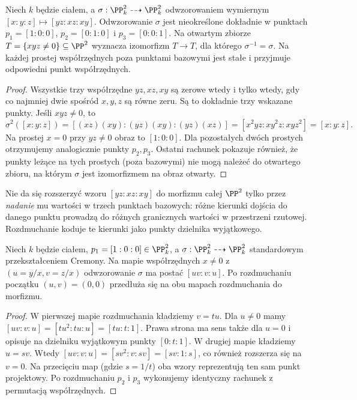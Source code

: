 \begin{stwierdzenie}
\label{st:ga8-cremona-basic}
Niech $k$ będzie ciałem, a
$\sigma:\PP^2_k\dashrightarrow\PP^2_k$ odwzorowaniem wymiernym
$[x:y:z]\mapsto[yz:xz:xy]$.
Odwzorowanie $\sigma$ jest nieokreślone dokładnie w punktach
$p_1=[1:0:0]$, $p_2=[0:1:0]$ i $p_3=[0:0:1]$.
Na otwartym zbiorze $T=\{xyz\ne0\}\subseteq\PP^2$
wyznacza izomorfizm $T\to T$, dla którego
$\sigma^{-1}=\sigma$. Na każdej prostej współrzędnych
poza punktami bazowymi jest stałe i przyjmuje
odpowiedni punkt współrzędnych.
\end{stwierdzenie}
\begin{proof}
Wszystkie trzy współrzędne $yz,xz,xy$ są zerowe
wtedy i tylko wtedy, gdy co najmniej dwie spośród
$x,y,z$ są równe zeru. Są to dokładnie trzy wskazane
punkty. Jeśli $xyz\ne0$, to
\[
\sigma^2([x:y:z])
=[(xz)(xy):(yz)(xy):(yz)(xz)]
=[x^2yz:xy^2z:xyz^2]=[x:y:z].
\]
Na prostej $x=0$ przy $yz\ne0$ obraz to $[1:0:0]$.
Dla pozostałych dwóch prostych otrzymujemy analogicznie
punkty $p_2,p_3$. Ostatni rachunek pokazuje również,
że punkty leżące na tych prostych (poza bazowymi)
nie mogą należeć do otwartego zbioru, na którym
$\sigma$ jest izomorfizmem na obraz otwarty.
\end{proof}

\begin{uwaga}
Nie da się rozszerzyć wzoru $[yz:xz:xy]$ do morfizmu
całej $\PP^2$ tylko przez \emph{nadanie} mu wartości
w trzech punktach bazowych: różne kierunki dojścia
do danego punktu prowadzą do różnych granicznych
wartości w przestrzeni rzutowej. Rozdmuchanie koduje
te kierunki jako punkty dzielnika wyjątkowego.
\end{uwaga}

\begin{stwierdzenie}
\label{st:ga8-local-resolution}
Niech $k$ będzie ciałem, $p_1=[1:0:0]\in\PP^2_k$, a
$\sigma:\PP^2_k\dashrightarrow\PP^2_k$ standardowym
przekształceniem Cremony. Na mapie współrzędnych $x\ne0$
z $(u=y/x,v=z/x)$ odwzorowanie $\sigma$ ma postać
$[uv:v:u]$. Po rozdmuchaniu początku $(u,v)=(0,0)$
przedłuża się na obu mapach rozdmuchania do morfizmu.
\end{stwierdzenie}
\begin{proof}
W pierwszej mapie rozdmuchania kładziemy $v=tu$.
Dla $u\ne0$ mamy
$[uv:v:u]=[tu^2:tu:u]=[tu:t:1]$.
Prawa strona ma sens także dla $u=0$ i opisuje
na dzielniku wyjątkowym punkty $[0:t:1]$.
W drugiej mapie kładziemy $u=sv$. Wtedy
$[uv:v:u]=[sv^2:v:sv]=[sv:1:s]$,
co również rozszerza się na $v=0$.
Na przecięciu map (gdzie $s=1/t$)
oba wzory reprezentują ten sam punkt projektowy.
Po rozdmuchaniu $p_2$ i $p_3$ wykonujemy identyczny
rachunek z permutacją współrzędnych.
\end{proof}

